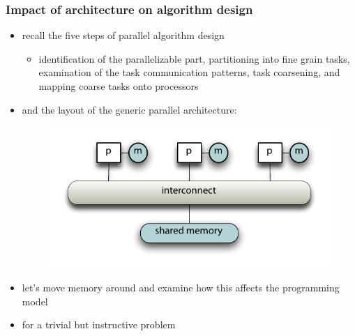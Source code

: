%
%
%
%


\begin{frame}[fragile]
%
  \frametitle{Impact of architecture on algorithm design}
%
  \begin{itemize}
%
    \item recall the five steps of parallel algorithm design
      \begin{itemize}
      \item identification of the parallelizable part, partitioning into fine grain tasks,
        examination of the task communication patterns, task coarsening, and mapping coarse
        tasks onto processors
      \end{itemize}
%
    \item and the layout of the generic parallel architecture:
%
  \begin{figure}
    \centering
    \includegraphics[width=.5\linewidth]{figures/generic-parallel-architecture.pdf}
    \label{fig:gpa-redux}
  \end{figure}
%
  \item let's move memory around and examine how this affects the programming model
  \item for a trivial but instructive problem
  \end{itemize}
%
\end{frame}

